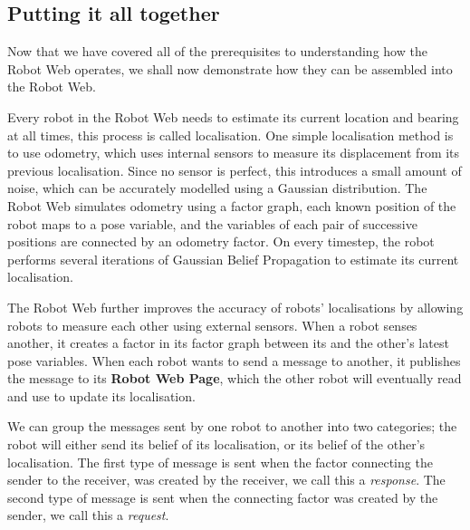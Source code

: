 

\subsection{Putting it all together}
Now that we have covered all of the prerequisites to understanding how the Robot Web operates, we shall now demonstrate how they can be assembled into the Robot Web.

Every robot in the Robot Web needs to estimate its current location and bearing at all times, this process is called localisation. One simple localisation method is to use odometry, which uses internal sensors to measure its displacement from its previous localisation. Since no sensor is perfect, this introduces a small amount of noise, which can be accurately modelled using a Gaussian distribution. The Robot Web simulates odometry using a factor graph, each known position of the robot maps to a pose variable, and the variables of each pair of successive positions are connected by an odometry factor. On every timestep, the robot performs several iterations of Gaussian Belief Propagation to estimate its current localisation.

The Robot Web further improves the accuracy of robots' localisations by allowing robots to measure each other using external sensors. When a robot senses another, it creates a factor in its factor graph between its and the other's latest pose variables. When each robot wants to send a message to another, it publishes the message to its \textbf{Robot Web Page}, which the other robot will eventually read and use to update its localisation.

We can group the messages sent by one robot to another into two categories; the robot will either send its belief of its localisation, or its belief of the other's localisation. The first type of message is sent when the factor connecting the sender to the receiver, was created by the receiver, we call this a \textit{response}. The second type of message is sent when the connecting factor was created by the sender, we call this a \textit{request}. 

